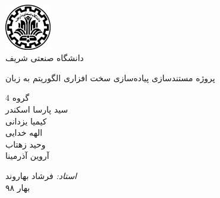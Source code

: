 \begin{titlepage}

	\begin{center}
		
		\includegraphics[width=2cm]{images/tuoslogo.png}
		\\
		{ دانشگاه صنعتی شریف  }
		\\[6cm]
		
		پروژه مستندسازی پیاده‌سازی سخت افزاری الگوریتم به زبان 
		\\[4cm]
		\linespread{1}
		
		{\Large گروه 4 }
		\\[0.4cm]
		{\small سید پارسا اسکندر
			\\[0.2cm] کیمیا یزدانی
			\\[0.2cm] الهه خدایی 
			\\[0.2cm] وحید زهتاب 
			\\[0.2cm] آروین آذرمینا
			\\[0.5cm]
		}
	
		{\large
			\emph{استاد: }
			فرشاد بهاروند
		}
		\\[4cm]
		
		
		{\large بهار ۹۸ }
	\end{center}
	
\end{titlepage}